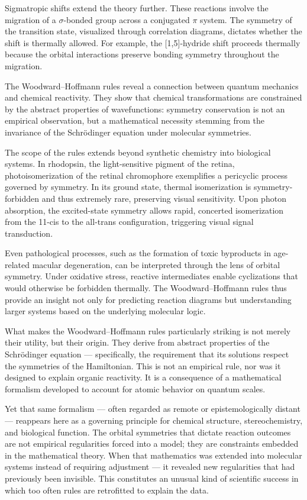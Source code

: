 Sigmatropic shifts extend the theory further. These reactions involve the migration of a $\sigma$-bonded group across a conjugated $\pi$ system. The symmetry of the transition state, visualized through correlation diagrams, dictates whether the shift is thermally allowed. For example, the [1,5]-hydride shift proceeds thermally because the orbital interactions preserve bonding symmetry throughout the migration.

The Woodward–Hoffmann rules reveal a connection between quantum mechanics and chemical reactivity. They show that chemical transformations are constrained by the abstract properties of wavefunctions: symmetry conservation is not an empirical observation, but a mathematical necessity stemming from the invariance of the Schrödinger equation under molecular symmetries.

The scope of the rules extends beyond synthetic chemistry into biological systems. In rhodopsin, the light-sensitive pigment of the retina, photoisomerization of the retinal chromophore exemplifies a pericyclic process governed by symmetry. In its ground state, thermal isomerization is symmetry-forbidden and thus extremely rare, preserving visual sensitivity. Upon photon absorption, the excited-state symmetry allows rapid, concerted isomerization from the 11-cis to the all-trans configuration, triggering visual signal transduction.

Even pathological processes, such as the formation of toxic byproducts in age-related macular degeneration, can be interpreted through the lens of orbital symmetry. Under oxidative stress, reactive intermediates enable cyclizations that would otherwise be forbidden thermally. The Woodward–Hoffmann rules thus provide an insight not only for predicting reaction diagrams but understanding larger systems based on the underlying molecular logic.
\newpage
\begin{commentary}
What makes the Woodward–Hoffmann rules particularly striking is not merely their utility, but their origin. They derive from abstract properties of the Schrödinger equation — specifically, the requirement that its solutions respect the symmetries of the Hamiltonian. This is not an empirical rule, nor was it designed to explain organic reactivity. It is a consequence of a mathematical formalism developed to account for atomic behavior on quantum scales.

Yet that same formalism — often regarded as remote or epistemologically distant — reappears here as a governing principle for chemical structure, stereochemistry, and biological function. The orbital symmetries that dictate reaction outcomes are not empirical regularities forced into a model; they are constraints embedded in the mathematical theory. When that mathematics was extended into molecular systems instead of requiring adjustment — it revealed new regularities that had previously been invisible. This constitutes an unusual kind of scientific success in which too often rules are retrofitted to explain the data. 
\end{commentary}
